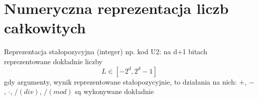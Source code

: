 \section{Numeryczna reprezentacja liczb całkowitych}
\begin{frame}{Reprezentacja stałopozycyjna (integer)}
    np. kod U2: na d+1 bitach reprezentowane dokładnie liczby
    \[
    L \in [-2^d, 2^d-1]
    \]
    gdy argumenty, wynik reprezentowane stałopozycyjnie, to działania na nich: $+$, $-$, $\cdot$, $/ (div)$, $/ (mod)$ są wykonywane dokładnie
\end{frame}
